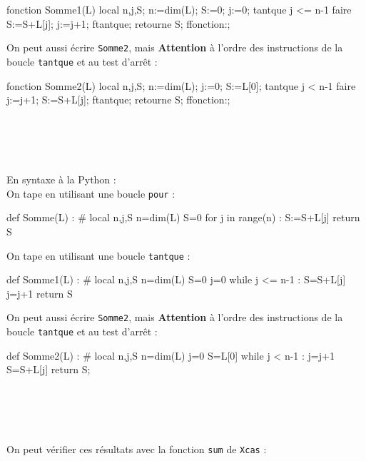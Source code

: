 \documentclass[12pt,a4paper]{book}
\begin{document}
\begin{giacjshere}
\begin{giaconload}
fonction Somme1(L) 
 local n,j,S;
 n:=dim(L);
 S:=0;
 j:=0;
 tantque j <= n-1 faire
   S:=S+L[j];
   j:=j+1;
 ftantque;
 retourne S;
ffonction:;
\end{giaconload}
On peut aussi \'ecrire {\tt Somme2}, mais {\bf Attention} 
\`a l'ordre des instructions de la boucle {\tt tantque} et au test d'arr\^et :
\begin{giaconload}
fonction Somme2(L) 
 local n,j,S;
 n:=dim(L);
 j:=0;
 S:=L[0];
 tantque j < n-1 faire
   j:=j+1;
   S:=S+L[j];
 ftantque;
 retourne S;
ffonction:;
\end{giaconload}
\\
\\
\\
\\
En syntaxe \`a la Python :\\
On tape en utilisant une boucle {\tt pour} :
\begin{giacprog}
def Somme(L) :
    # local n,j,S
    n=dim(L)
    S=0
    for j in range(n) :
        S:=S+L[j]
    return S
\end{giacprog}
On tape en utilisant une boucle {\tt tantque} :
\begin{giacprog}
def Somme1(L) :
    # local n,j,S
    n=dim(L)
    S=0
    j=0
    while j <= n-1 :
        S=S+L[j]
        j=j+1
    return S
\end{giacprog}
On peut aussi \'ecrire {\tt Somme2}, mais {\bf Attention} 
\`a l'ordre des instructions de la boucle {\tt tantque} et au test d'arr\^et :
\begin{giacprog}
def Somme2(L) :
    # local n,j,S
    n=dim(L)
    j=0
    S=L[0]
    while j < n-1 :
        j=j+1
        S=S+L[j]
    return S;
\end{giacprog}
\\
\\
\\
\\
On peut v\'erifier ces r\'esultats avec la fonction {\tt sum} de {\tt Xcas} :\\
\\


\end{giacjshere}
\end{document}
